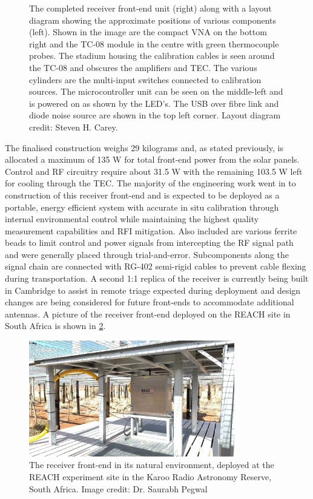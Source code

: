 \begin{figure}[t]
\begin{subfigure}{.45\textwidth}
    \end{subfigure}
    \caption{The completed receiver front-end unit (right) along with a layout diagram showing the approximate positions of various components (left). Shown in the image are the compact VNA on the bottom right and the TC-08 module in the centre with green thermocouple probes. The stadium housing the calibration cables is seen around the TC-08 and obscures the amplifiers and TEC. The various cylinders are the multi-input switches connected to calibration sources. The microcontroller unit can be seen on the middle-left and is powered on as shown by the LED's. The USB over fibre link and diode noise source are shown in the top left corner. Layout diagram credit: Steven H. Carey.}
    \label{fig:frontend_complete}
\end{figure}
The finalised construction weighs 29 kilograms and, as stated previously, is allocated a maximum of 135 W for total front-end power from the solar panels. Control and RF circuitry require about 31.5 W with the remaining 103.5 W left for cooling through the TEC. The majority of the engineering work went in to construction of this receiver front-end and is expected to be deployed as a portable, energy efficient system with accurate in situ calibration through internal environmental control while maintaining the highest quality measurement capabilities and RFI mitigation. Also included are various ferrite beads to limit control and power signals from intercepting the RF signal path and were generally placed through trial-and-error. Subcomponents along the signal chain are connected with RG-402 semi-rigid cables to prevent cable flexing during transportation. A second 1:1 replica of the receiver is currently being built in Cambridge to assist in remote triage expected during deployment and design changes are being considered for future front-ends to accommodate additional antennas. A picture of the receiver front-end deployed on the REACH site in South Africa is shown in \cref{fig:frontend_deployed}.
\begin{figure}
    \centering
    \includegraphics[width=0.8\textwidth]{receiver_installed.jpeg}
    \caption{The receiver front-end in its natural environment, deployed at the REACH experiment site in the Karoo Radio Astronomy Reserve, South Africa. Image credit: Dr. Saurabh Pegwal}
    \label{fig:frontend_deployed}
\end{figure}


